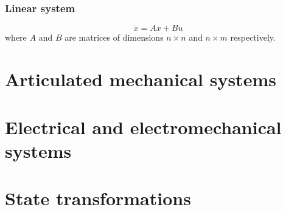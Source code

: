 \documentclass[12pt, openany]{report}
\theoremstyle{definition}
\begin{document}
\subsection{Linear system}
\begin{equation}
    \dot x = Ax + Bu
\end{equation}
where \(A\) and \(B\) are matrices of dimensions \(n\times n\) and \(n\times m\) respectively. 
\chapter{Articulated mechanical systems}

\chapter{Electrical and electromechanical systems}

\chapter{State transformations}
\end{document}
